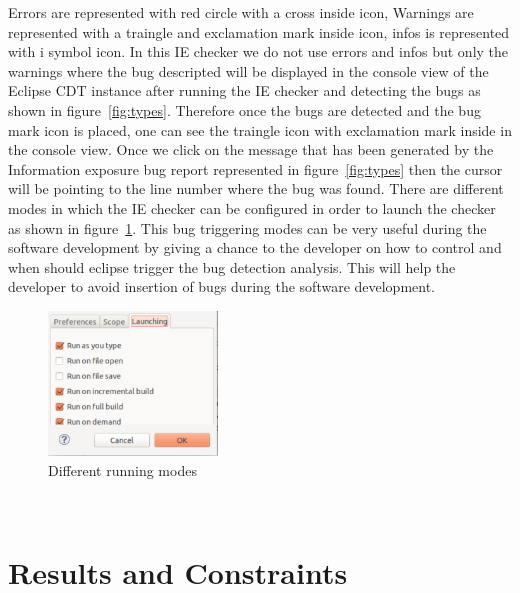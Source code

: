 Errors are represented with red circle with a cross inside icon, Warnings are represented
with a traingle and exclamation mark inside icon, infos is represented with i symbol icon.
In this IE checker we do not use errors and infos but only the warnings
where the bug descripted will be displayed in the console view of
the Eclipse CDT instance after running the IE checker and detecting
the bugs as shown in figure~\ref{fig:types}. Therefore once the bugs are
detected and the bug mark icon is placed, one can see the traingle icon 
with exclamation mark inside in the console view. Once we click on the
message that has been generated by the Information exposure bug report
represented in figure~\ref{fig:types} then the cursor will be pointing
to the line number where the bug was found. There are different modes in which
the IE checker can be configured in order to launch the checker as shown 
in figure~\ref{fig:modes}. This bug triggering modes can be very useful during the 
software development by giving a chance to the developer on how to control
and when should eclipse trigger the bug detection analysis. This will help the
developer to avoid insertion of bugs during the software development.
\begin{figure}[!htb]
\centering
\includegraphics[width=0.4\textwidth]{pdf/modes.pdf}
\caption{Different running modes}
\label{fig:modes}
\end{figure}\\


\section{Results and Constraints}



